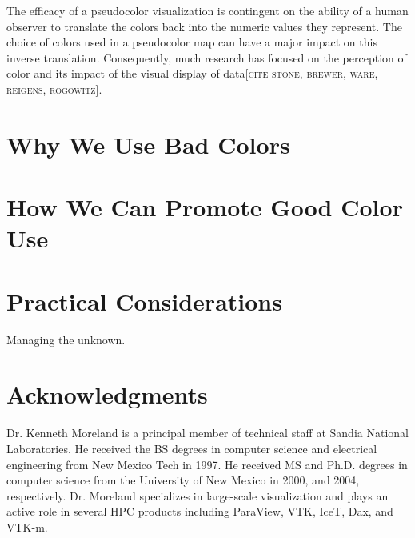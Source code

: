 \documentclass[letterpaper,twocolumn,fleqn]{article}
\newcommand{\fix}[1]{{\color{red}\textsc{[#1]}}}
\begin{document}
The efficacy of a pseudocolor visualization is contingent on the ability of
a human observer to translate the colors back into the numeric values they
represent. The choice of colors used in a pseudocolor map can have a major
impact on this inverse translation. Consequently, much research has focused
on the perception of color and its impact of the visual display of
data\fix{cite stone, brewer, ware, reigens, rogowitz}.


\section{Why We Use Bad Colors}


\section{How We Can Promote Good Color Use}


\section{Practical Considerations}

Managing the unknown.


\section{Acknowledgments} 


\small


\begin{biography}
\noindent
Dr. Kenneth Moreland is a principal member of technical staff at Sandia
National Laboratories. He received the BS degrees in computer science and
electrical engineering from New Mexico Tech in 1997. He received MS and
Ph.D. degrees in computer science from the University of New Mexico in
2000, and 2004, respectively. Dr. Moreland specializes in large-scale
visualization and plays an active role in several HPC products including
ParaView, VTK, IceT, Dax, and VTK-m.
\end{biography}
\end{document}
